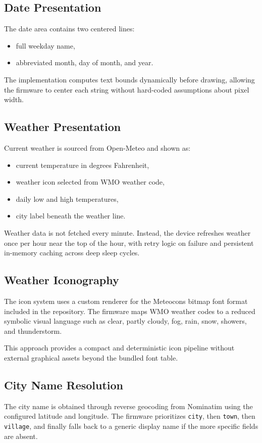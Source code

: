 \documentclass[11pt]{article}
\begin{document}
\subsection{Date Presentation}
The date area contains two centered lines:
\begin{itemize}
  \item full weekday name,
  \item abbreviated month, day of month, and year.
\end{itemize}

The implementation computes text bounds dynamically before drawing, allowing the firmware to center each string without hard-coded assumptions about pixel width.

\subsection{Weather Presentation}
Current weather is sourced from Open-Meteo and shown as:
\begin{itemize}
  \item current temperature in degrees Fahrenheit,
  \item weather icon selected from WMO weather code,
  \item daily low and high temperatures,
  \item city label beneath the weather line.
\end{itemize}

Weather data is not fetched every minute. Instead, the device refreshes weather once per hour near the top of the hour, with retry logic on failure and persistent in-memory caching across deep sleep cycles.

\subsection{Weather Iconography}
The icon system uses a custom renderer for the Meteocons bitmap font format included in the repository. The firmware maps WMO weather codes to a reduced symbolic visual language such as clear, partly cloudy, fog, rain, snow, showers, and thunderstorm.

This approach provides a compact and deterministic icon pipeline without external graphical assets beyond the bundled font table.

\subsection{City Name Resolution}
The city name is obtained through reverse geocoding from Nominatim using the configured latitude and longitude. The firmware prioritizes \texttt{city}, then \texttt{town}, then \texttt{village}, and finally falls back to a generic display name if the more specific fields are absent.
\end{document}
